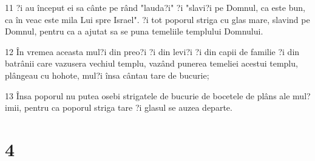 \par 11 ?i au început ei sa cânte pe rând "lauda?i" ?i "slavi?i pe Domnul, ca este bun, ca în veac este mila Lui spre Israel". ?i tot poporul striga cu glas mare, slavind pe Domnul, pentru ca a ajutat sa se puna temeliile templului Domnului.
\par 12 În vremea aceasta mul?i din preo?i ?i din levi?i ?i din capii de familie ?i din batrânii care vazusera vechiul templu, vazând punerea temeliei acestui templu, plângeau cu hohote, mul?i însa cântau tare de bucurie;
\par 13 Însa poporul nu putea osebi strigatele de bucurie de bocetele de plâns ale mul?imii, pentru ca poporul striga tare ?i glasul se auzea departe.

\chapter{4}

